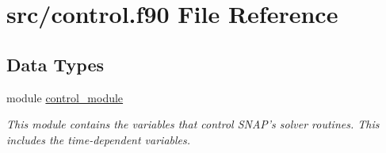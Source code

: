 \hypertarget{control_8f90}{\section{src/control.f90 File Reference}
\label{control_8f90}
}
\subsection*{Data Types}
\begin{DoxyCompactItemize}
\item 
module \hyperlink{classcontrol__module}{control\-\_\-module}
\begin{DoxyCompactList}\small\item\em This module contains the variables that control S\-N\-A\-P's solver routines. This includes the time-\/dependent variables. \end{DoxyCompactList}\end{DoxyCompactItemize}
